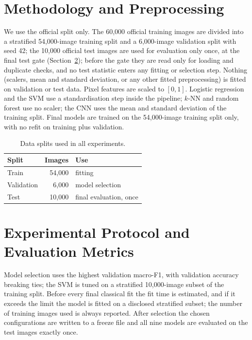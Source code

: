 \documentclass[conference]{IEEEtran}
\begin{document}


\section{Methodology and Preprocessing}
\label{sec:method}
We use the official split only. The 60{,}000 official training images are divided into a stratified
54{,}000-image training split and a 6{,}000-image validation split with seed 42; the 10{,}000 official test
images are used for evaluation only once, at the final test gate (Section~\ref{sec:protocol}); before the gate they are read only for loading and duplicate checks, and no test statistic enters any fitting or selection step. Nothing (scalers, mean and
standard deviation, or any other fitted preprocessing) is fitted on validation or test data. Pixel features are
scaled to $[0,1]$. Logistic regression and the SVM use a standardisation step inside the pipeline; $k$-NN and
random forest use no scaler; the CNN uses the mean and standard deviation of the training split. Final models are
trained on the 54{,}000-image training split only, with no refit on training plus validation.

\begin{table}[t]
\centering
\caption{Data splits used in all experiments.}
\label{tab:splits}
\begin{tabular}{lrl}
\toprule
Split & Images & Use \\
\midrule
Train & 54{,}000 & fitting \\
Validation & 6{,}000 & model selection \\
Test & 10{,}000 & final evaluation, once \\
\bottomrule
\end{tabular}
\end{table}







\section{Experimental Protocol and Evaluation Metrics}
\label{sec:protocol}
Model selection uses the highest validation macro-F1, with validation accuracy breaking ties; the SVM is tuned
on a stratified 10{,}000-image subset of the training split. Before every final classical fit the fit time is
estimated, and if it exceeds the limit the model is fitted on a disclosed stratified subset; the number of
training images used is always reported. After selection the chosen configurations are written to a freeze file
and all nine models are evaluated on the test images exactly once. 
\end{document}
